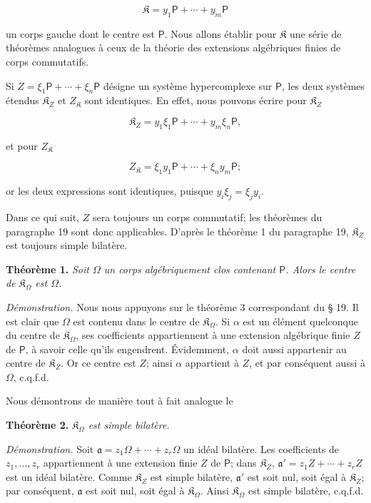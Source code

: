 \[
\mathfrak K=y_1\mathsf P+\cdots+y_m\mathsf P
\]

un corps gauche dont le centre est \(\mathsf P\). Nous allons établir pour \(\mathfrak K\) une série de théorèmes analogues à ceux de la théorie des extensions algébriques finies de corps commutatifs.

Si \(Z=\xi_1\mathsf P+\cdots+\xi_n\mathsf P\) désigne un système hypercomplexe sur \(\mathsf P\), les deux systèmes étendus \(\mathfrak K_Z\) et \(Z_{\mathfrak K}\) sont identiques. En effet, nous pouvons écrire pour \(\mathfrak K_Z\)

\[
\mathfrak K_Z=y_1\xi_1\mathsf P+\cdots+y_m\xi_n\mathsf P,
\]

et pour \(Z_{\mathfrak K}\)

\[
Z_{\mathfrak K}=\xi_1y_1\mathsf P+\cdots+\xi_ny_m\mathsf P;
\]

or les deux expressions sont identiques, puisque \(y_i\xi_j=\xi_jy_i\).

Dans ce qui suit, \(Z\) sera toujours un corps commutatif; les théorèmes du paragraphe 19 sont donc applicables. D'après le théorème 1 du paragraphe 19, \(\mathfrak K_Z\) est toujours simple bilatère.

\textbf{Théorème 1.} \emph{Soit \(\Omega\) un corps algébriquement clos contenant \(\mathsf P\). Alors le centre de \(\mathfrak K_\Omega\) est \(\Omega\).}

\emph{Démonstration.} Nous nous appuyons sur le théorème 3 correspondant du \S{} 19. Il est clair que \(\Omega\) est contenu dans le centre de \(\mathfrak K_\Omega\). Si \(\alpha\) est un élément quelconque du centre de \(\mathfrak K_\Omega\), ses coefficients appartiennent à une extension algébrique finie \(Z\) de \(\mathsf P\), à savoir celle qu'ils engendrent. Évidemment, \(\alpha\) doit aussi appartenir au centre de \(\mathfrak K_Z\). Or ce centre est \(Z\); ainsi \(\alpha\) appartient à \(Z\), et par conséquent aussi à \(\Omega\), c.q.f.d.

Nous démontrons de manière tout à fait analogue le

\textbf{Théorème 2.} \emph{\(\mathfrak K_\Omega\) est simple bilatère.}

\emph{Démonstration.} Soit \(\mathfrak a=z_1\Omega+\cdots+z_r\Omega\) un idéal bilatère. Les coefficients de \(z_1,\ldots,z_r\) appartiennent à une extension finie \(Z\) de \(\mathsf P\); dans \(\mathfrak K_Z\), \(\mathfrak a'=z_1Z+\cdots+z_rZ\) est un idéal bilatère. Comme \(\mathfrak K_Z\) est simple bilatère, \(\mathfrak a'\) est soit nul, soit égal à \(\mathfrak K_Z\); par conséquent, \(\mathfrak a\) est soit nul, soit égal à \(\mathfrak K_\Omega\). Ainsi \(\mathfrak K_\Omega\) est simple bilatère, c.q.f.d.

